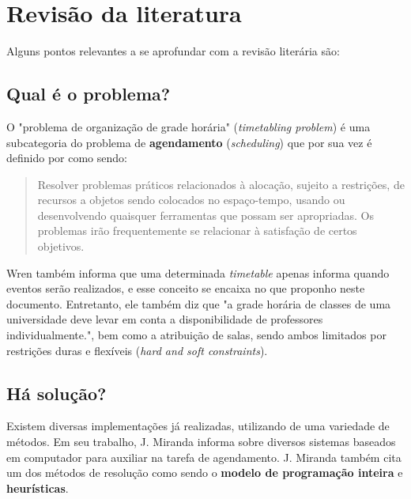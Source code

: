 \chapter{Revisão da literatura}

Alguns pontos relevantes a se aprofundar com a revisão literária são:

\section{Qual é o problema?}

O "problema de organização de grade horária" (\textit{timetabling problem}) é uma subcategoria do problema de \textbf{agendamento} (\textit{scheduling}) que por sua vez é definido por \cite{WREN1996} como sendo:

\begin{quote}\footnotesize
  Resolver problemas práticos relacionados à alocação, sujeito a restrições, de recursos a objetos sendo colocados no espaço-tempo, usando ou desenvolvendo quaisquer ferramentas que possam ser apropriadas. Os problemas irão frequentemente se relacionar à satisfação de certos objetivos.
\end{quote}

Wren também informa que uma determinada \textit{timetable} apenas informa quando eventos serão realizados, e esse conceito se encaixa no que proponho neste documento. Entretanto, ele também diz que "a grade horária de classes de uma universidade deve levar em conta a disponibilidade de professores individualmente.", bem como a atribuição de salas, sendo ambos limitados por restrições duras e flexíveis (\textit{hard and soft constraints}).

\section{Há solução?}

Existem diversas implementações já realizadas, utilizando de uma variedade de métodos. Em seu trabalho, J. Miranda \cite{MIRANDA2012505} informa sobre diversos sistemas baseados em computador para auxiliar na tarefa de agendamento. J. Miranda também cita um dos métodos de resolução como sendo o \textbf{modelo de programação inteira} e \textbf{heurísticas}.


